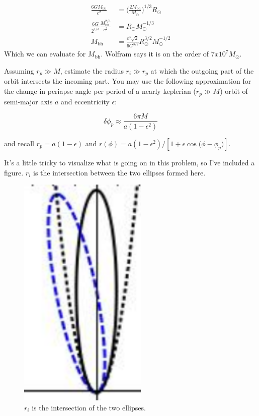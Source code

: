 \documentclass[11pt,largemargins]{homework}
\begin{document}
\begin{alphaparts}
\begin{subequations}
\begin{align}
\frac{6 G M_\mathrm{bh}}{c^2} &= \bigg(\frac{2 M_\mathrm{bh}}{M_{\odot}} \bigg) ^ {1/3} R_{\odot} \\
\frac{6G}{2^{1/3}} \frac{M_{\mathrm{bh}}^{2/3}}{c^2} &= R_{\odot} M_{\odot}^{-1/3} \\
M_{\mathrm{bh}} &= \frac{c^3 \sqrt{2}}{6 G^{3/2}} R_{\odot}^{3/2} M_{\odot}^{-1/2}
\end{align}
\end{subequations}
Which we can evaluate for $M_{\mathrm{bh}}$.  Wolfram says it is on the order of $7 x 10^{7} M_{\odot}$.  

\questionpart

Assuming $r_p \gg M$, estimate the radius $r_i \gg r_p$ at which the outgoing part of the orbit intersects the incoming part.  You may use the following approximation for the change in periapse angle per period of a nearly keplerian ($r_p \gg M$) orbit of semi-major axis $a$ and eccentricity $\epsilon:$

\begin{equation}
\delta \phi_{p} \approx \frac{6 \pi M}{a(1 - \epsilon^2)}
\end{equation}

and recall $r_{p} = a(1 - \epsilon)$ and $r(\phi) = a(1 - \epsilon^2) / [1 + \epsilon \cos{(\phi - \phi_{p}})]$.

It's a little tricky to visualize what is going on in this problem, so I've included a figure.  $r_i$ is the intersection between the two ellipses formed here. 
\begin{figure}[h]
\centering
\includegraphics[scale=0.6]{orbits}
\caption{$r_{i}$ is the intersection of the two ellipses.}
\end{figure}


\end{alphaparts}
\end{document}

